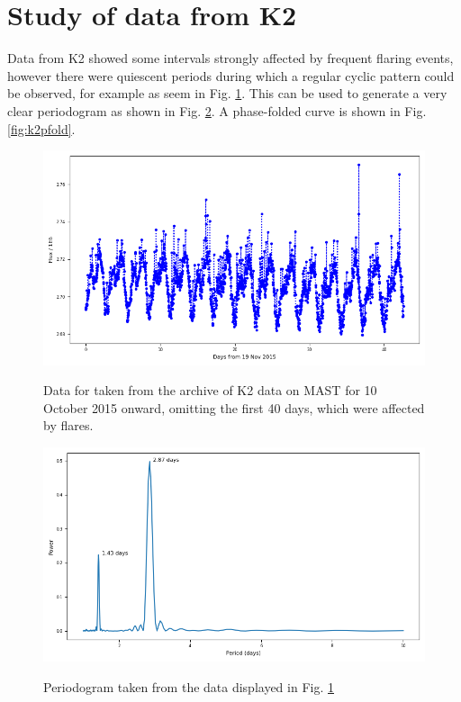 \section{Study of data from K2}
\protect\label{section:k2data}

Data from K2 showed some intervals strongly affected by frequent flaring events,
however there were quiescent periods during which a regular cyclic pattern could
be observed, for example as seem in Fig. \ref{fig:k2lcurve}. This can be used to
generate a very clear periodogram as shown in Fig. \ref{fig:k2pgram}. A
phase-folded curve is shown in Fig. \ref{fig:k2pfold}.

\begin{figure}[!htbp]
\begin{center}
\includegraphics[scale=0.40]{k2/images/k2lcurve.png} \\
\vspace{-.5cm}
\end{center}   
\caption{Data for {\ross} taken from the archive of K2 data on MAST for 10
October 2015 onward, omitting the first 40 days, which were affected by
flares.}\protect\label{fig:k2lcurve}
\end{figure}

\begin{figure}[!htbp]
\begin{center}
\includegraphics[scale=0.40]{k2/images/k2_pg.png} \\
\vspace{-.5cm}
\end{center}   
\caption{Periodogram taken from the data displayed in Fig.
\ref{fig:k2lcurve}}\protect\label{fig:k2pgram}
\end{figure}

